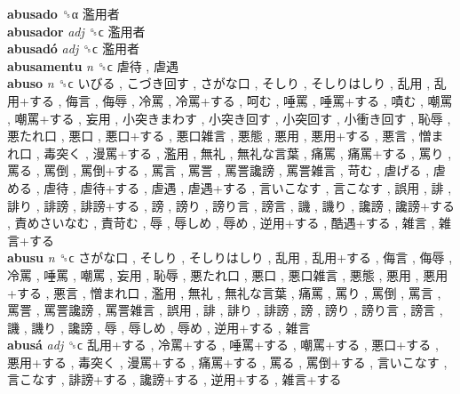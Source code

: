 \textbf{abusado} ␝α   濫用者   \\
\textbf{abusador} \emph{adj}  ␝ϲ   濫用者   \\
\textbf{abusadó} \emph{adj}  ␝ϲ   濫用者   \\
\textbf{abusamentu} \emph{n}  ␝ϲ   虐待 ,  虐遇   \\
\textbf{abuso} \emph{n}  ␝ϲ   いびる ,  こづき回す ,  さがな口 ,  そしり ,  そしりはしり ,  乱用 ,  乱用+する ,  侮言 ,  侮辱 ,  冷罵 ,  冷罵+する ,  呵む ,  唾罵 ,  唾罵+する ,  嘖む ,  嘲罵 ,  嘲罵+する ,  妄用 ,  小突きまわす ,  小突き回す ,  小突回す ,  小衝き回す ,  恥辱 ,  悪たれ口 ,  悪口 ,  悪口+する ,  悪口雑言 ,  悪態 ,  悪用 ,  悪用+する ,  悪言 ,  憎まれ口 ,  毒突く ,  漫罵+する ,  濫用 ,  無礼 ,  無礼な言葉 ,  痛罵 ,  痛罵+する ,  罵り ,  罵る ,  罵倒 ,  罵倒+する ,  罵言 ,  罵詈 ,  罵詈讒謗 ,  罵詈雑言 ,  苛む ,  虐げる ,  虐める ,  虐待 ,  虐待+する ,  虐遇 ,  虐遇+する ,  言いこなす ,  言こなす ,  誤用 ,  誹 ,  誹り ,  誹謗 ,  誹謗+する ,  謗 ,  謗り ,  謗り言 ,  謗言 ,  譏 ,  譏り ,  讒謗 ,  讒謗+する ,  責めさいなむ ,  責苛む ,  辱 ,  辱しめ ,  辱め ,  逆用+する ,  酷遇+する ,  雑言 ,  雑言+する   \\
\textbf{abusu} \emph{n}  ␝ϲ   さがな口 ,  そしり ,  そしりはしり ,  乱用 ,  乱用+する ,  侮言 ,  侮辱 ,  冷罵 ,  唾罵 ,  嘲罵 ,  妄用 ,  恥辱 ,  悪たれ口 ,  悪口 ,  悪口雑言 ,  悪態 ,  悪用 ,  悪用+する ,  悪言 ,  憎まれ口 ,  濫用 ,  無礼 ,  無礼な言葉 ,  痛罵 ,  罵り ,  罵倒 ,  罵言 ,  罵詈 ,  罵詈讒謗 ,  罵詈雑言 ,  誤用 ,  誹 ,  誹り ,  誹謗 ,  謗 ,  謗り ,  謗り言 ,  謗言 ,  譏 ,  譏り ,  讒謗 ,  辱 ,  辱しめ ,  辱め ,  逆用+する ,  雑言   \\
\textbf{abusá} \emph{adj}  ␝ϲ   乱用+する ,  冷罵+する ,  唾罵+する ,  嘲罵+する ,  悪口+する ,  悪用+する ,  毒突く ,  漫罵+する ,  痛罵+する ,  罵る ,  罵倒+する ,  言いこなす ,  言こなす ,  誹謗+する ,  讒謗+する ,  逆用+する ,  雑言+する   \\
